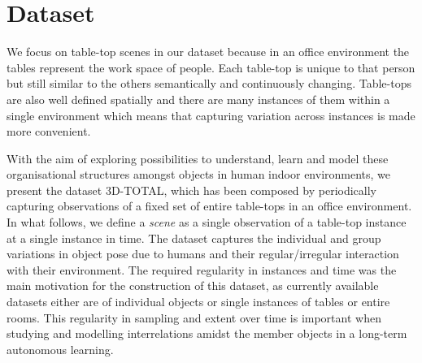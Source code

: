 \documentclass[letterpaper, 10 pt, conference]{ieeeconf}
\begin{document}
\section{Dataset}
\label{sec:Dataset}
We focus on table-top scenes in our dataset because in an office 
environment the tables represent the work space of people. Each 
table-top is unique to that person but still similar to the others 
semantically and continuously changing. Table-tops are also well 
defined spatially and there are many instances of them within a 
single environment which means that capturing variation across 
instances is made more convenient.

With the aim of exploring possibilities to understand, learn and model these organisational structures amongst objects in human indoor 
environments, we present the dataset 3D-TOTAL, which has been composed by periodically capturing observations of a fixed set of entire 
table-tops in an office environment. In what follows, we define a \textit{scene} as a single observation of a table-top instance at a single 
instance in time. The dataset captures the individual and group variations in object pose due to humans and their regular/irregular interaction with their environment. The 
required regularity in instances and time was the main motivation for the construction of this dataset, as currently available datasets 
either are of individual objects or single instances of tables or entire rooms. This regularity in sampling and extent over time is 
important when studying and modelling interrelations amidst the member objects in a long-term autonomous learning. 
\end{document}
